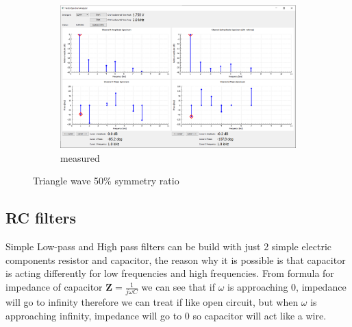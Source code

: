 \documentclass[notitlepage, a4paper, 11pt]{article}
\begin{document}
\begin{figure}[H]
\begin{subfigure}[][][t]{0.3\textwidth}
			\includegraphics[width=\textwidth, trim=10 80 555 100, clip]{../img/Circuit1/trig50}
			\caption{measured}
			\label{fig:meas-signal-d}
		\end{subfigure}
		\caption{Triangle wave 50\% symmetry ratio}
		\label{fig:pure-sin}
	\end{figure}
		
	\subsection{RC filters}\label{sec:rc-filters}
	
	Simple Low-pass and High pass filters can be build with just 2 simple electric components resistor and capacitor, the reason why it is possible is that capacitor is acting differently for low frequencies and high frequencies. From formula for impedance of capacitor $\mathbf{Z}=\frac{1}{j\omega C}$ we can see that if $\omega$ is approaching 0, impedance will go to infinity therefore we can treat if like open circuit, but when $\omega$ is approaching infinity, impedance will go to 0 so capacitor will act like a wire.
	
\end{document}
